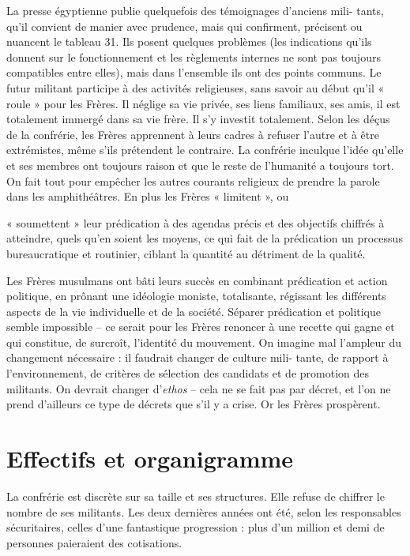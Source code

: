 La presse égyptienne publie quelquefois des témoignages d'anciens mili-
tants, qu'il convient de manier avec prudence, mais qui confirment,
précisent ou nuancent le tableau 31. Ils posent quelques problèmes (les
indications qu'ils donnent sur le fonctionnement et les règlements
internes ne sont pas toujours compatibles entre elles), mais dans
l'ensemble ils ont des points communs. Le futur militant participe à des
activités religieuses, sans savoir au début qu'il « roule » pour les
Frères. Il néglige sa vie privée, ses liens familiaux, ses amis, il est
totalement immergé dans sa vie frère. Il s'y investit totalement. Selon
les déçus de la confrérie, les Frères apprennent à leurs cadres à
refuser l'autre
et à être extrémistes, même s'ils prétendent le contraire. La confrérie
inculque l'idée qu'elle et ses membres ont toujours raison et que le
reste de l'humanité a toujours tort. On fait tout pour empêcher les
autres courants religieux de prendre la parole dans les amphithéâtres.
En plus les Frères « limitent », ou

« soumettent » leur prédication à des agendas précis et des objectifs
chiffrés à atteindre, quels qu'en soient les moyens, ce qui fait de la
prédication un processus bureaucratique et routinier, ciblant la
quantité au détriment de la qualité.

Les Frères musulmans ont bâti leurs succès en combinant prédication et
action politique, en prônant une idéologie moniste, totalisante,
régissant les différents aspects de la vie individuelle et de la
société. Séparer prédication et politique semble impossible -- ce serait
pour les Frères renoncer à une recette qui gagne et qui constitue, de
surcroît, l'identité du mouvement. On imagine mal l'ampleur du
changement nécessaire : il faudrait changer de culture mili- tante, de
rapport à l'environnement, de critères de sélection des candidats et de
promotion des militants. On devrait changer d'\emph{ethos} -- cela ne se
fait pas par décret, et l'on ne prend d'ailleurs ce type de décrets que
s'il y a crise. Or les Frères prospèrent.
 

\hypertarget{effectifs-et-organigramme}{%
\section{Effectifs et organigramme}\label{effectifs-et-organigramme}}

 
La confrérie est discrète sur sa taille et ses structures. Elle refuse
de chiffrer le nombre de ses militants\emph{.} Les deux dernières années
ont été, selon les responsables sécuritaires, celles d'une fantastique
progression : plus d'un million et demi de personnes paieraient des
cotisations.

